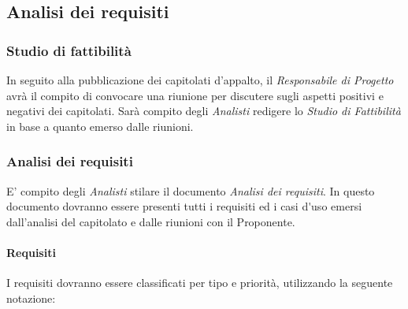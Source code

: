 \subsection{Analisi dei requisiti}

\subsubsection{Studio di fattibilità}
In seguito alla pubblicazione dei capitolati d'appalto, il \textit{Responsabile di Progetto} avrà il compito di convocare una riunione per discutere sugli aspetti positivi e negativi dei capitolati. Sarà compito degli \textit{Analisti} redigere lo \textit{Studio di Fattibilità} in base a quanto emerso dalle riunioni.

\subsubsection{Analisi dei requisiti}
E' compito degli \textit{Analisti} stilare il documento \textit{Analisi dei requisiti}.
In questo documento dovranno essere presenti tutti i requisiti ed i \gls{casi d'uso} emersi dall'analisi del capitolato e dalle riunioni con il Proponente.\\

\paragraph{Requisiti}

I requisiti dovranno essere classificati per tipo e priorità, utilizzando la seguente notazione:

